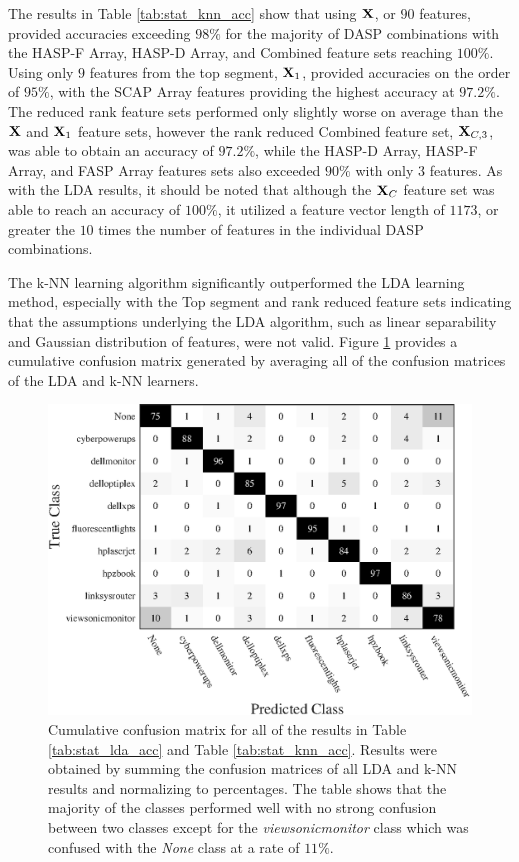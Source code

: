 The results in Table \ref{tab:stat_knn_acc} show that using $\textit{\bf{X}}$, or $90$ features, provided accuracies exceeding $98\%$ for the majority of DASP combinations with the HASP-F Array, HASP-D Array, and Combined feature sets reaching $100\%$.  Using only $9$ features from the top segment, $\textit{\bf{X}}_1$, provided accuracies on the order of $95\%$, with the SCAP Array features providing the highest accuracy at $97.2\%$.  The reduced rank feature sets performed only slightly worse on average than the $\textit{\bf{X}}$ and $\textit{\bf{X}}_1$ feature sets, however the rank reduced Combined feature set, $\textit{\bf{X}}_{C,3}$, was able to obtain an accuracy of $97.2\%$, while the HASP-D Array, HASP-F Array, and FASP Array features sets also exceeded $90\%$ with only $3$ features.  As with the LDA results, it should be noted that although the $\textit{\bf{X}}_C$ feature set was able to reach an accuracy of $100\%$, it utilized a feature vector length of $1173$, or greater the $10$ times the number of features in the individual DASP combinations. 

The k-NN learning algorithm significantly outperformed the LDA learning method, especially with the Top segment and rank reduced feature sets indicating that the assumptions underlying the LDA algorithm, such as linear separability and Gaussian distribution of features, were not valid.  Figure \ref{fig:stat_cm_cum} provides a cumulative confusion matrix generated by averaging all of the confusion matrices of the LDA and k-NN learners.   

\begin{figure}[tb]
	\includegraphics[width=\textwidth]{./dasp_algorithm_results/dasp_stat_AllCombined_conf.eps}
	\centering
	\caption{Cumulative confusion matrix for all of the results in Table \ref{tab:stat_lda_acc} and Table \ref{tab:stat_knn_acc}.  Results were obtained by summing the confusion matrices of all LDA and k-NN results and normalizing to percentages.  The table shows that the majority of the classes performed well with no strong confusion between two classes except for the \textit{viewsonicmonitor} class which was confused with the \textit{None} class at a rate of $11\%$.}
	\label{fig:stat_cm_cum}
\end{figure}

